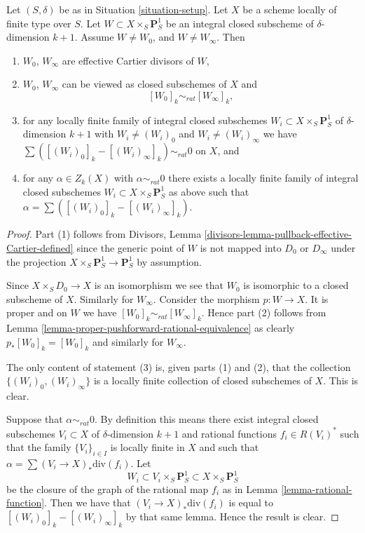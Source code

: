\begin{lemma}
\label{lemma-rational-equivalence-family}
Let $(S, \delta)$ be as in Situation \ref{situation-setup}.
Let $X$ be a scheme locally of finite type over $S$.
Let $W \subset X \times_S \mathbf{P}^1_S$ be an integral
closed subscheme of $\delta$-dimension $k + 1$.
Assume $W \not = W_0$, and $W \not = W_\infty$. Then
\begin{enumerate}
\item $W_0$, $W_\infty$ are effective Cartier divisors of $W$,
\item $W_0$, $W_\infty$ can be viewed as closed subschemes
of $X$ and
$$
[W_0]_k \sim_{rat} [W_\infty]_k,
$$
\item for any locally finite family of
integral closed subschemes
$W_i \subset X \times_S \mathbf{P}^1_S$
of $\delta$-dimension $k + 1$ with $W_i \not = (W_i)_0$ and
$W_i \not = (W_i)_\infty$ we have
$\sum ([(W_i)_0]_k - [(W_i)_\infty]_k) \sim_{rat} 0$
on $X$, and
\item for any $\alpha \in Z_k(X)$ with $\alpha \sim_{rat} 0$
there exists a locally finite family of
integral closed subschemes $W_i \subset X \times_S \mathbf{P}^1_S$
as above such that $\alpha = \sum ([(W_i)_0]_k - [(W_i)_\infty]_k)$.
\end{enumerate}
\end{lemma}

\begin{proof}
Part (1) follows from
Divisors, Lemma \ref{divisors-lemma-pullback-effective-Cartier-defined}
since the generic point
of $W$ is not mapped into $D_0$ or $D_\infty$ under the projection
$X \times_S \mathbf{P}^1_S \to \mathbf{P}^1_S$ by assumption.

\medskip\noindent
Since $X \times_S D_0 \to X$ is an isomorphism we see that $W_0$
is isomorphic to a closed subscheme of $X$. Similarly for $W_\infty$.
Consider the morphism $p : W \to X$. It is proper and on $W$ we have
$[W_0]_k \sim_{rat} [W_\infty]_k$. Hence part (2) follows from
Lemma \ref{lemma-proper-pushforward-rational-equivalence} as clearly
$p_*[W_0]_k = [W_0]_k$ and similarly for $W_\infty$.

\medskip\noindent
The only content of statement (3) is, given parts (1) and (2), that
the collection $\{(W_i)_0, (W_i)_\infty\}$ is a locally finite collection
of closed subschemes of $X$. This is clear.

\medskip\noindent
Suppose that $\alpha \sim_{rat} 0$.
By definition this means there exist integral closed subschemes
$V_i \subset X$ of $\delta$-dimension $k + 1$ and rational
functions $f_i \in R(V_i)^*$ such that the family
$\{V_i\}_{i \in I}$ is locally finite in $X$ and such that
$\alpha = \sum (V_i \to X)_*\text{div}(f_i)$.
Let
$$
W_i \subset V_i \times_S \mathbf{P}^1_S \subset X \times_S \mathbf{P}^1_S
$$
be the closure of the graph of the rational map $f_i$ as in
Lemma \ref{lemma-rational-function}.
Then we have that $(V_i \to X)_*\text{div}(f_i)$
is equal to $[(W_i)_0]_k - [(W_i)_\infty]_k$ by that same lemma.
Hence the result is clear.
\end{proof}

